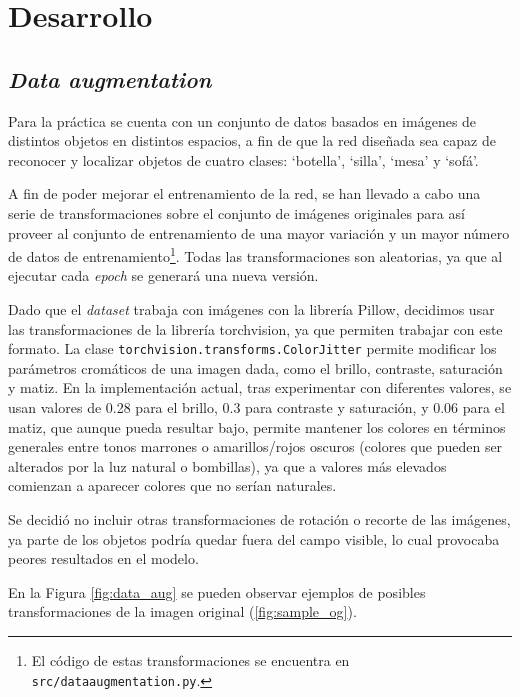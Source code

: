 \section{Desarrollo}


\subsection{\textit{Data augmentation}}
Para la práctica se cuenta con un conjunto de datos basados en imágenes de distintos objetos en distintos espacios, a fin de que la red diseñada sea capaz de reconocer y localizar objetos de cuatro clases: `botella', `silla', `mesa' y `sofá'.

A fin de poder mejorar el entrenamiento de la red, se han llevado a cabo una serie de transformaciones sobre el conjunto de imágenes originales para así proveer al conjunto de entrenamiento de una mayor variación y un mayor número de datos de entrenamiento\footnote{El código de estas transformaciones se encuentra en \texttt{src/data\textunderscore augmentation.py}.}. Todas las transformaciones son aleatorias, ya que al ejecutar cada \textit{epoch} se generará una nueva versión.

Dado que el \textit{dataset} trabaja con imágenes con la librería Pillow, decidimos usar las transformaciones de la librería torchvision, ya que permiten trabajar con este formato. La clase \texttt{torchvision.transforms.ColorJitter} permite modificar los parámetros cromáticos de una imagen dada, como el brillo, contraste, saturación y matiz. En la implementación actual, tras experimentar con diferentes valores, se usan valores de 0.28 para el brillo, 0.3 para contraste y saturación, y 0.06 para el matiz, que aunque pueda resultar bajo, permite mantener los colores en términos generales entre tonos marrones o amarillos/rojos oscuros (colores que pueden ser alterados por la luz natural o bombillas), ya que a valores más elevados comienzan a aparecer colores que no serían naturales.

Se decidió no incluir otras transformaciones de rotación o recorte de las imágenes, ya parte de los objetos podría quedar fuera del campo visible, lo cual provocaba peores resultados en el modelo.

En la Figura \ref{fig:data_aug} se pueden observar ejemplos de posibles transformaciones de la imagen original (\ref{fig:sample_og}).


